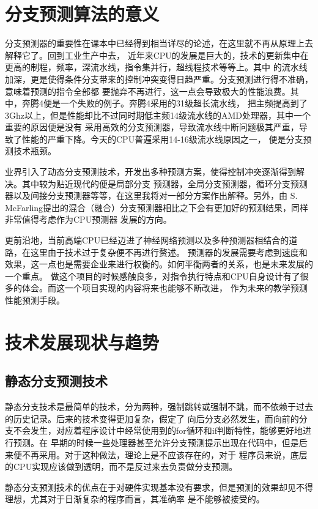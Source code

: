 \documentclass[forprint]{WHUBachelor}
\begin{document}
   \section{分支预测算法的意义}
  
   分支预测器的重要性在课本中已经得到相当详尽的论述，在这里就不再从原理上去解释它了。回到工业生产中去，
近年来CPU的发展是巨大的，技术的更新集中在更高的制程，频率，深流水线，指令集并行，超线程技术等等上。其中
的流水线加深，更是使得条件分支带来的控制冲突变得日趋严重。分支预测进行得不准确，意味着预测的指令全部都
要抛弃不再进行，这一点会导致极大的性能浪费。其中，奔腾4便是一个失败的例子。奔腾4采用的31级超长流水线，
把主频提高到了3Ghz以上，但是性能却比不过同时期低主频14级流水线的AMD处理器，其中一个重要的原因便是没有
采用高效的分支预测器，导致流水线中断问题极其严重，导致了性能的严重下降。今天的CPU普遍采用14-16级流水线原因之一，
便是分支预测技术瓶颈。\par
业界引入了动态分支预测技术，开发出多种预测方案，使得控制冲突逐渐得到解决。其中较为贴近现代的便是局部分支
预测器，全局分支预测器，循环分支预测器以及间接分支预测器等等，在这里我将对一部分方案作出解释。另外，由
S. McFarling提出的混合（融合）分支预测器相比之下会有更加好的预测结果，同样非常值得考虑作为CPU预测器
发展的方向。\par
更前沿地，当前高端CPU已经迈进了神经网络预测以及多种预测器相结合的道路，在这里由于技术过于复杂便不再进行赘述。
预测器的发展需要考虑到速度和效果，这一点也是需要企业来进行权衡的。如何平衡两者的关系，也是未来发展的一个重点。
做这个项目的时候感触良多，对指令执行特点和CPU自身设计有了很多的体会。而这一个项目实现的内容将来也能够不断改进，
作为未来的教学预测性能预测手段。
  \section{技术发展现状与趋势}\label{sec-compile}

  \subsection{静态分支预测技术}
静态分支技术是最简单的技术，分为两种，强制跳转或强制不跳，而不依赖于过去的历史记录。后来的技术变得更加复杂，假定了
向后分支必然发生，而向前的分支不会发生，对应着程序设计中经常使用到的for循环和if判断特性，能够更好地进行预测。在
早期的时候一些处理器甚至允许分支预测提示出现在代码中，但是后来便不再采用。对于这种做法，理论上是不应该存在的，对于
程序员来说，底层的CPU实现应该做到透明，而不是反过来去负责做分支预测。\par
静态分支预测技术的优点在于对硬件实现基本没有要求，但是预测的效果却见不得理想，尤其对于日渐复杂的程序而言，其准确率
是不能够被接受的。
\end{document}
